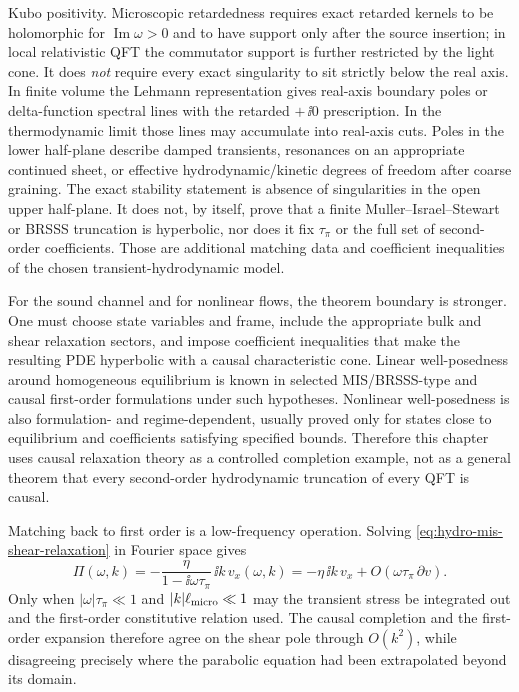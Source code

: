 Kubo positivity.  Microscopic retardedness requires exact retarded kernels to
be holomorphic for \(\operatorname{Im}\omega>0\) and to have support only
after the source insertion; in local relativistic QFT the commutator support
is further restricted by the light cone.  It does \emph{not} require every
exact singularity to sit strictly below the real axis.  In finite volume the
Lehmann representation gives real-axis boundary poles or delta-function
spectral lines with the retarded \(+\,\ii0\) prescription.  In the
thermodynamic limit those lines may accumulate into real-axis cuts.  Poles in
the lower half-plane describe damped transients, resonances on an appropriate
continued sheet, or effective hydrodynamic/kinetic degrees of freedom after
coarse graining.  The exact stability statement is absence of singularities in
the open upper half-plane.  It does not, by itself, prove that a finite
Muller--Israel--Stewart or BRSSS truncation is hyperbolic, nor does it fix
\(\tau_\pi\) or the full set of second-order coefficients.  Those are
additional matching data and coefficient inequalities of the chosen
transient-hydrodynamic model.

For the sound channel and for nonlinear flows, the theorem boundary is
stronger.  One must choose state variables and frame, include the appropriate
bulk and shear relaxation sectors, and impose coefficient inequalities that
make the resulting PDE hyperbolic with a causal characteristic cone.  Linear
well-posedness around homogeneous equilibrium is known in selected
MIS/BRSSS-type and causal first-order formulations under such hypotheses.
Nonlinear well-posedness is also formulation- and regime-dependent, usually
proved only for states close to equilibrium and coefficients satisfying
specified bounds.  Therefore this chapter uses causal relaxation theory as a
controlled completion example, not as a general theorem that every
second-order hydrodynamic truncation of every QFT is causal.

Matching back to first order is a low-frequency operation.  Solving
\eqref{eq:hydro-mis-shear-relaxation} in Fourier space gives
\[
  \Pi(\omega,k)
  =
  -\frac{\eta}{1-\ii\omega\tau_\pi}\,\ii k\,v_x(\omega,k)
  =
  -\eta\,\ii k\,v_x
  +O(\omega\tau_\pi\,\partial v).
\]
Only when \(|\omega|\tau_\pi\ll1\) and \(|k|\ell_{\rm micro}\ll1\) may the
transient stress be integrated out and the first-order constitutive relation
used.  The causal completion and the first-order expansion therefore agree on
the shear pole through \(O(k^2)\), while disagreeing precisely where the
parabolic equation had been extrapolated beyond its domain.

